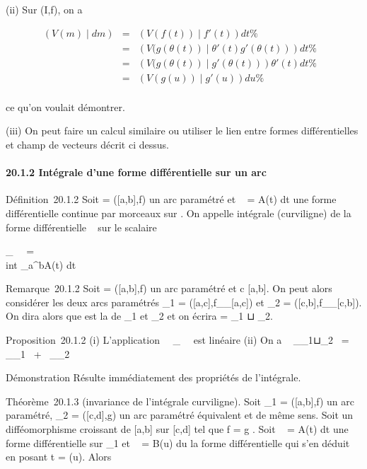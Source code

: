 \documentclass[]{article}
\begin{document}
(ii) Sur (I,f), on a

\begin{align*} (V
(m)∣dm)& =& \left (V
(f(t))∣f'(t)\right ) dt \%&
\\ & =& \left (V
(g(\theta(t))∣\theta'(t)g'(\theta(t))\right )
dt\%& \\ & =& \left (V
(g(\theta(t))∣g'(\theta(t))\right )\theta'(t)
dt\%& \\ & =& \left (V
(g(u))∣g'(u)\right ) du \%&
\\ \end{align*}

ce qu'on voulait démontrer.

(iii) On peut faire un calcul similaire ou utiliser le lien entre formes
différentielles et champ de vecteurs décrit ci dessus.

\paragraph{20.1.2 Intégrale d'une forme différentielle sur un arc}

Définition~20.1.2 Soit \Gamma = ({[}a,b{]},f) un arc paramétré et \alpha~ = A(t) dt
une forme différentielle continue par morceaux sur \Gamma. On appelle
intégrale (curviligne) de la forme différentielle \alpha~ sur \Gamma le scalaire

\int  \_\Gamma~\alpha~ =\\int
 \_a^bA(t) dt

Remarque~20.1.2 Soit \Gamma = ({[}a,b{]},f) un arc paramétré et c \in
{[}a,b{]}. On peut alors considérer les deux arcs paramétrés
\Gamma\_1 = ({[}a,c{]},f\_\textbar{}\_{[}a,c{]}) et
\Gamma\_2 = ({[}c,b{]},f\_\textbar{}\_{[}c,b{]}). On
dira alors que \Gamma est la \jmathuxtaposition de \Gamma\_1 et \Gamma\_2 et
on écrira \Gamma = \Gamma\_1 ⊔ \Gamma\_2.

Proposition~20.1.2 (i) L'application
\alpha~\mapsto~\int  \_\Gamma~\alpha~
est linéaire (ii) On a \int ~
\_\Gamma\_1⊔\Gamma\_2\alpha~ =\int ~
\_\Gamma\_1\alpha~ +\int ~
\_\Gamma\_2\alpha~

Démonstration Résulte immédiatement des propriétés de l'intégrale.

Théorème~20.1.3 (invariance de l'intégrale curviligne). Soit
\Gamma\_1 = ({[}a,b{]},f) un arc paramétré, \Gamma\_2 =
({[}c,d{]},g) un arc paramétré équivalent et de même sens. Soit \theta un
difféomorphisme croissant de {[}a,b{]} sur {[}c,d{]} tel que f = g \cdot \theta.
Soit \alpha~ = A(t) dt une forme différentielle sur \Gamma\_1 et \beta~ = B(u)
du la forme différentielle qui s'en déduit en posant t = \theta(u). Alors
\end{document}
